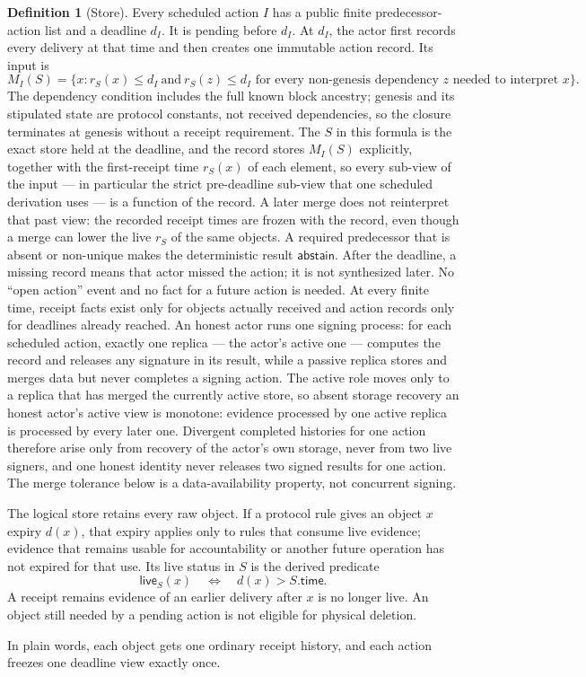 \ifx\litemode\undefined\documentclass{article}\fi
\theoremstyle{plain}
\theoremstyle{definition}
\newtheorem{definition}{Definition}
\theoremstyle{remark}
\begin{document}
\begin{definition}[Store]
Every scheduled action \(I\) has a public finite predecessor-action list and
a deadline \(d_I\).  It is pending before \(d_I\).  At \(d_I\), the actor
first records every delivery at that time and then creates one immutable
action record.  Its input is
\[
 M_I(S)=
 \{x:r_S(x)\leq d_I\ \text{and}\ r_S(z)\leq d_I
       \text{ for every non-genesis dependency }z\text{ needed to interpret }x\}.
\]
The dependency condition includes the full known block ancestry;
genesis and its stipulated state are protocol constants, not received
dependencies, so the closure terminates at genesis without a receipt
requirement.  The
\(S\) in this formula is the exact store held at the deadline, and
the record stores \(M_I(S)\) explicitly, together with the
first-receipt time \(r_S(x)\) of each element, so every sub-view of
the input --- in particular the strict pre-deadline sub-view that one
scheduled derivation uses --- is a function of the record.  A later
merge does not reinterpret that past view: the recorded receipt times
are frozen with the record, even though a merge can lower the live
\(r_S\) of the same objects.  A required predecessor that is absent
or non-unique makes the deterministic result \(\mathsf{abstain}\).  After the
deadline, a missing record means that actor missed the action; it is not
synthesized later.  No ``open action'' event and no fact for a future action
is needed.  At every finite time, receipt facts exist only for objects
actually received and action records only for deadlines already reached.
An honest actor runs one signing process: for each scheduled action,
exactly one replica --- the actor's active one --- computes the record
and releases any signature in its result, while a passive replica stores
and merges data but never completes a signing action.  The active role
moves only to a replica that has merged the currently active store, so
absent storage recovery an honest actor's active view is monotone:
evidence processed by one active replica is processed by every later
one.  Divergent
completed histories for one action therefore arise only from recovery of
the actor's own storage, never from two live signers, and one honest
identity never releases two signed results for one action.  The merge
tolerance below is a data-availability property, not concurrent signing.

The logical store retains every raw object.  If a protocol rule gives an
object \(x\) expiry \(d(x)\), that expiry applies only to rules that consume
live evidence; evidence that remains usable for accountability or another
future operation has not expired for that use.  Its live status in \(S\) is
the derived predicate
\[
  \mathsf{live}_S(x)\quad\Longleftrightarrow\quad d(x)>S.\mathsf{time}.
\]
A receipt remains evidence of an earlier delivery after \(x\) is no longer
live.  An object still needed by a pending action is not eligible for physical
deletion.

In plain words, each object gets one ordinary receipt history, and each action
freezes one deadline view exactly once.
\end{definition}
\end{document}
